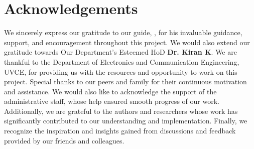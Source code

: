 \chapter*{Acknowledgements}

\vspace{10mm}

 We sincerely express our gratitude to our guide, \textbf{\guideA}, for his invaluable guidance, support, and encouragement throughout this project. We would also extend our gratitude towards Our Department's Esteemed HoD \textbf{Dr. Kiran K}. We are thankful to the Department of Electronics and Communication Engineering, UVCE, for providing us with the resources and opportunity to work on this project. Special thanks to our peers and family for their continuous motivation and assistance. We would also like to acknowledge the support of the administrative staff, whose help ensured smooth progress of our work. Additionally, we are grateful to the authors and researchers whose work has significantly contributed to our understanding and implementation. Finally, we recognize the inspiration and insights gained from discussions and feedback provided by our friends and colleagues. 
